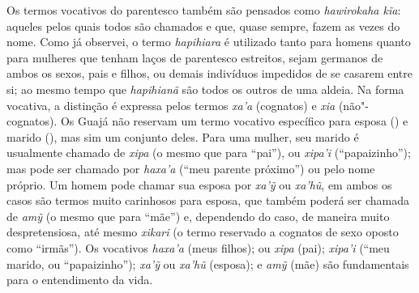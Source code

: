 Os termos vocativos do parentesco também são pensados como
\emph{hawirokaha kĩa}: aqueles pelos quais todos são chamados e que,
quase sempre, fazem as vezes do nome. Como já observei, o termo
\emph{hapihiara} é utilizado tanto para homens quanto para mulheres que
tenham laços de parentesco estreitos, sejam germanos de ambos os sexos,
pais e filhos, ou demais indivíduos impedidos de se casarem entre si; ao
mesmo tempo que \emph{hapihianã} são todos os outros de uma aldeia. Na
forma vocativa, a distinção é expressa pelos termos \emph{xa'a}
(cognatos) e \emph{xia} (não"-cognatos). Os Guajá não reservam um termo
vocativo específico para esposa () e marido (), mas sim um conjunto
deles. Para uma mulher, seu marido é usualmente chamado de \emph{xipa}
(o mesmo que para ``pai''), ou \emph{xipa'i} (``papaizinho''); mas pode
ser chamado por \emph{haxa'a} (``meu parente próximo'') ou pelo nome
próprio. Um homem pode chamar sua esposa por \emph{xa'ỹ} ou
\emph{xa'hũ}, em ambos os casos são termos muito carinhosos para esposa,
que também poderá ser chamada de \emph{amỹ} (o mesmo que para ``mãe'') e,
dependendo do caso, de maneira muito despretensiosa, até mesmo
\emph{xikari} (o termo reservado a cognatos de sexo oposto como
``irmãs''). Os vocativos \emph{haxa'a} (meus filhos); ou \emph{xipa}
(pai); \emph{xipa'i} (``meu marido, ou ``papaizinho''); \emph{xa'ỹ} ou
\emph{xa'hũ} (esposa); e \emph{amỹ} (mãe) são fundamentais para o
entendimento da vida.

